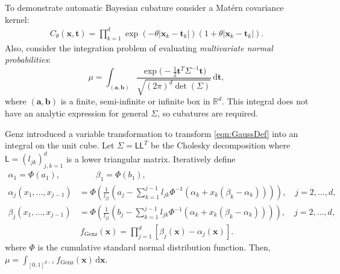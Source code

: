 \documentclass{iitthesis}          %
\newcommand{\bm}[1]{\boldsymbol{#1}}
\newcommand{\mSigma}{\mathsf{\Sigma}}
\newcommand{\dif}[1]{\text{d}{#1}}
\newcommand{\reals}{\mathbb{R}}
\newcommand{\va}{\bm{a}}
\newcommand{\vb}{\bm{b}}
\newcommand{\vt}{\bm{t}}
\newcommand{\vx}{\bm{x}}
\newcommand{\dvx}{\dif{\bm{x}}}
\newcommand{\dvt}{\dif{\bm{t}}}
\newcommand{\mL}{\mathsf{L}}
\begin{document}
 \label{MVN_example}

To demonstrate automatic Bayesian cubature consider a Mat\'ern covariance kernel:
\begin{align*}
C_{\theta}(\vx, \vt) = \prod_{k=1}^d \exp(-\theta|\vx_k-\vt_k|)(1+\theta |\vx_k-\vt_k|).
\end{align*}
Also, consider the integration problem of evaluating  \emph{multivariate normal probabilities}:
\begin{equation}
\label{eqn:GaussDef}
\mu = \int_{(\va,\vb)} \frac{\exp\bigl(- \frac 12 \vt^T \mSigma^{-1} \vt \bigr)}{\sqrt{(2 \pi)^d \det(\mSigma)}} \, \dvt,
\end{equation}
where $(\va,\vb)$ is a finite, semi-infinite or infinite box in $\reals^d$.  This integral does not have an analytic expression for general $\mSigma$, so cubatures are required.  

Genz \cite{Gen93} introduced a variable transformation to transform \eqref{eqn:GaussDef} into an integral on the unit cube.  Let $\mSigma= \mL \mL^T$ be the Cholesky decomposition where $\mL = (l_{jk})_{j,k=1}^d$ is a lower triangular matrix.  Iteratively define
\begin{align*}
\alpha_1 = \Phi(a_1), 
&\qquad
\beta_1 = \Phi(b_1),
\\
\alpha_j(x_1,...,x_{j-1}) &= 
\Phi
\left(
\frac{1}{l_{jj}} 
\left(
a_j - \sum_{k=1}^{j-1} l_{jk} \Phi^{-1}(\alpha_k + x_k(\beta_k-\alpha_k))
\right)
\right), \quad j=2,...,d,
\\
\beta_j(x_1,...,x_{j-1}) &= 
\Phi
\left(
\frac{1}{l_{jj}} 
\left(
b_j - \sum_{k=1}^{j-1} l_{jk} \Phi^{-1}(\alpha_k + x_k(\beta_k-\alpha_k))
\right)
\right), \quad j=2,...,d,
\end{align*}
\begin{align}
\label{eqn:fGenzdef}
f_{\text{Genz}}(\vx) = \prod_{j=1}^d [\beta_j(\vx) - \alpha_j(\vx)].
\end{align}
where $\Phi$ is the cumulative standard normal distribution function.  Then, $\mu = \int_{[0,1]^{d-1}} f_{\text{Genz}}(\vx) \, \dvx$.
\end{document}

